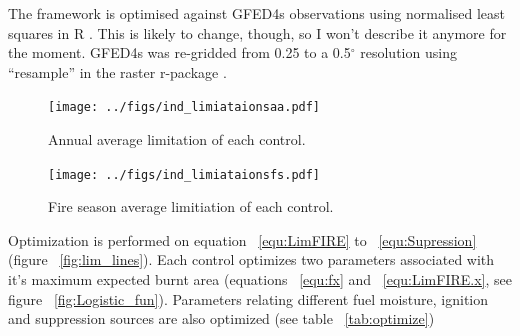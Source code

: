 \begin{shaded}
    The framework is optimised against GFED4s observations \citep{Giglio2013}  using normalised least squares in R \citep{rstats}.  This is likely to change, though, so I won't describe it anymore for the moment. GFED4s was re-gridded from 0.25 to a 0.5$^{\circ}$ resolution using ``resample'' in the raster r-package \citep{rraster}.
\end{shaded}

\begin{figure}[!ht]
  \centering
    \texttt{[image: ../figs/ind\_limiataionsaa.pdf]}
  \caption{Annual average limitation of each control.}
  \label{fig:Annual_average_con}
\end{figure}

\begin{figure}[!ht]
  \centering
    \texttt{[image: ../figs/ind\_limiataionsfs.pdf]}
  \caption{Fire season average limitiation of each control.}
  \label{fig:Season_con}
\end{figure}

Optimization is performed on equation ~\ref{equ:LimFIRE} to ~\ref{equ:Supression} (figure ~\ref{fig:lim_lines}). Each control optimizes two parameters associated with it's maximum expected burnt area (equations ~\ref{equ:fx} and ~\ref{equ:LimFIRE.x}, see figure ~\ref{fig:Logistic_fun}).
Parameters relating different fuel moisture, ignition and suppression sources are also optimized (see table ~\ref{tab:optimize})

